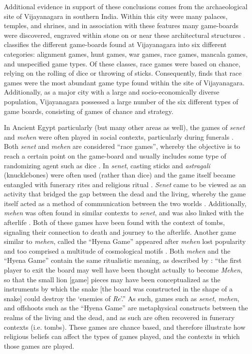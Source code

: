 \documentclass[%
	]{ijsra}
\begin{document}
Additional evidence in support of these conclusions comes from the archaeological site of Vijayanagara in southern India. Within this city were many palaces, temples, and shrines, and in association with these features many game-boards were discovered, engraved within stone on or near these architectural structures \parencite[462-463]{rogersdotter2015}. \textcite{rogersdotter2015} classifies the different game-boards found at Vijayanagara into six different categories: alignment games, hunt games, war games, race games, mancala games, and unspecified game types. Of these classes, race games were based on chance, relying on the rolling of dice or throwing of sticks. Consequently, \textcite{rogersdotter2015} finds that race games were the most abundant game type found within the site of Vijayanagara. Additionally, as a major city with a large and socio-economically diverse population, Vijayanagara possessed a large number of the six different types of game boards, consisting of games of chance and strategy. 

In Ancient Egypt particularly (but many other areas as well), the games of \textit{senet} and \textit{mehen} were often played in social contexts, particularly during funerals \parencite[34]{kendall2007}. Both \textit{senet} and \textit{mehen} are considered ``race games”, whereby the objective is to reach a certain point on the game-board and usually includes some type of randomizing agent such as dice \parencite[3]{gobet2004}. In \textit{senet}, casting sticks and \textit{astragali} (knucklebones) were often used (rather than dice) and the game itself became entangled with funerary rites and religious ritual \parencites{piccione1980}[58]{piccione2007}. \textit{Senet} came to be viewed as an activity that bridged the gap between the dead and the living, whereby the game itself acted as a method of communication between the two worlds \parencites[59]{piccione2007}{robinson2015}. Additionally, \textit{mehen} was often found in similar contexts to \textit{senet}, and was also linked with the afterlife \parencite[40-41]{kendall2007}. Both of these games have been found with the context of tombs, signaling their connection to death and journey to the afterlife. Another game similar to \textit{mehen}, called the ``Hyena Game” appeared after \textit{mehen} lost popularity and too comprised a multitude of cosmological motifs \parencite[44]{kendall2007}. Both \textit{mehen} and the ``Hyena Game” contain the same ritualistic meaning, as described by \textcite[44]{kendall2007}: ``the first player to exit the board may well have been thought actually to become \textit{Mehen}, so that the small lion [game] pieces may have been conceptualized as the instruments by which the snake [the board was constructed in the shape of a snake] could destroy the ‘enemies of \textit{Re}’.” As such, games such as \textit{senet}, \textit{mehen}, and offshoots such as the ``Hyena Game” are metaphysical constructs between the realms of the living and the dead, and as such are often recovered in funerary contexts (i.e. tombs). These games are chance based, and therefore illustrate how religious beliefs can affect the types of games played, and the contexts in which those games are played. 
\end{document}

